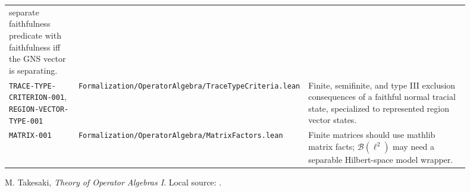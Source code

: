 \documentclass{article}
\newcommand{\cB}{\mathcal B}
\begin{document}
\begin{longtable}{@{}p{0.16\linewidth}p{0.34\linewidth}p{0.40\linewidth}@{}}
separate faithfulness predicate with faithfulness iff the GNS vector is
separating. \\
\texttt{TRACE-TYPE-CRITERION-001},
\texttt{REGION-VECTOR-TYPE-001} &
\texttt{Formalization/OperatorAlgebra/TraceTypeCriteria.lean} &
Finite, semifinite, and type III exclusion consequences of a faithful normal
tracial state, specialized to represented region vector states. \\
\texttt{MATRIX-001} &
\texttt{Formalization/OperatorAlgebra/MatrixFactors.lean} &
Finite matrices should use mathlib matrix facts; \(\cB(\ell^2)\) may need a
separable Hilbert-space model wrapper. \\
\bottomrule
\end{longtable}

\begin{thebibliography}{9}
M. Takesaki, \emph{Theory of Operator Algebras I}.  Local source:
.
\end{thebibliography}
\end{document}
